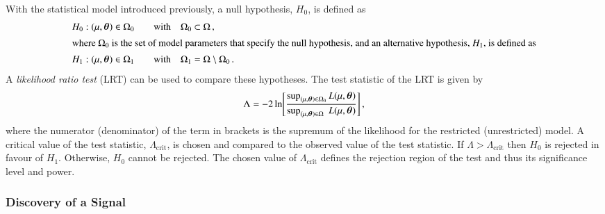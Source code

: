 With the statistical model introduced previously, a null hypothesis, $H_0$, is
defined as
\begin{alignat*}{3}
  &H_0: (\mu, \bm{\theta}) \in \Omega_0
    \quad &\text{with} \quad &\Omega_0 \subset \Omega \,\text{,} \\
  \intertext{where $\Omega_0$ is the set of model parameters that specify the
  null hypothesis, and an alternative hypothesis, $H_1$, is defined as}
  &H_1: (\mu, \bm{\theta}) \in \Omega_1
    \quad &\text{with} \quad &\Omega_1 = \Omega \setminus \Omega_0 \,\text{.}
\end{alignat*}
%
%
A \emph{likelihood ratio test} (LRT) can be used to compare these
hypotheses. The test statistic of the LRT is given by~\cite{casella2001}
\begin{align*}
  \Lambda = -2 \ln\mathopen{}\left[
  \frac{\sup_{(\mu, \bm{\theta}) \in \Omega_0} L(\mu, \bm{\theta})}
  {\sup_{(\mu, \bm{\theta}) \in \Omega\phantom{_0}} L(\mu, \bm{\theta})}
  \right]\mathclose{} \,\text{,}
\end{align*}
where the numerator (denominator) of the term in brackets is the supremum of the
likelihood for the restricted (unrestricted) model. A critical value of the test
statistic, $\Lambda_{\text{crit}}$, is chosen and compared to the observed value
of the test statistic. If $\Lambda > \Lambda_{\text{crit}}$ then $H_0$ is
rejected in favour of $H_1$. Otherwise, $H_0$ cannot be rejected. The chosen
value of $\Lambda_{\text{crit}}$ defines the rejection region of the test and
thus its significance level and power.


\subsubsection{Discovery of a Signal}

